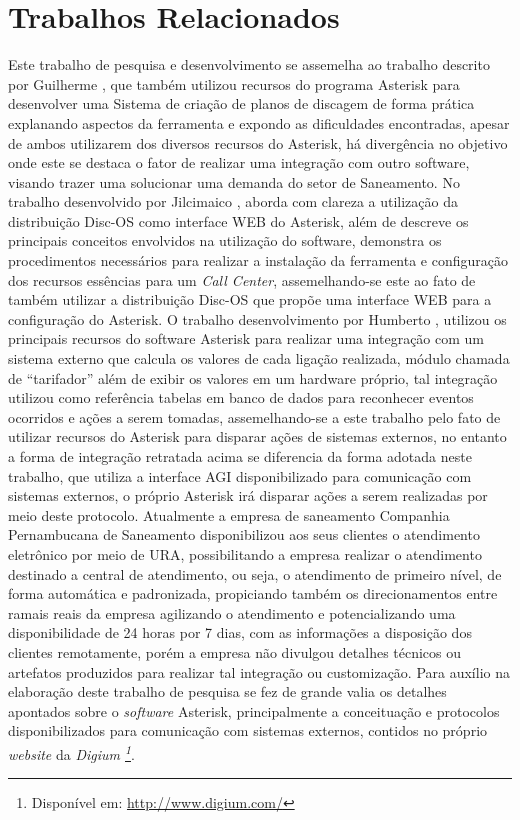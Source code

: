 \section*{Trabalhos Relacionados}
Este trabalho de pesquisa e desenvolvimento se assemelha ao trabalho descrito por Guilherme \cite{VIEIRA:2007}, que também utilizou recursos do programa Asterisk para desenvolver uma Sistema de criação de planos de discagem de forma prática explanando aspectos da ferramenta e expondo as dificuldades encontradas, apesar de ambos utilizarem dos diversos recursos do Asterisk, há divergência no objetivo onde este se destaca o fator de realizar uma integração com outro software, visando trazer uma solucionar uma demanda do setor de Saneamento.  No trabalho desenvolvido por Jilcimaico \cite{DARU:2008}, aborda com clareza a utilização da distribuição Disc-OS como interface WEB do Asterisk, além de descreve os principais conceitos envolvidos na utilização do software, demonstra os procedimentos necessários para realizar a instalação da ferramenta e configuração dos recursos essências para um \textit{Call Center}, assemelhando-se este ao fato de também utilizar a distribuição Disc-OS que propõe uma interface WEB para a configuração do Asterisk.
O trabalho desenvolvimento por Humberto \cite{CAMPOS:2007}, utilizou os principais recursos do software Asterisk para realizar uma integração com um sistema externo que calcula os valores de cada ligação realizada, módulo chamada de “tarifador” além de exibir os valores em um hardware próprio, tal integração utilizou como referência tabelas em banco de dados para reconhecer eventos ocorridos e ações a serem tomadas, assemelhando-se a este trabalho pelo fato de utilizar recursos do Asterisk para disparar ações de sistemas externos, no entanto a forma de integração retratada acima se diferencia da forma adotada neste trabalho, que utiliza a interface AGI disponibilizado para comunicação com sistemas externos, o próprio Asterisk irá disparar ações a serem realizadas por meio deste protocolo.
Atualmente a empresa de saneamento Companhia Pernambucana de Saneamento \cite{COMPESA:URA} disponibilizou aos seus clientes o atendimento eletrônico por meio de URA, possibilitando a empresa realizar o atendimento destinado a central de atendimento, ou seja, o atendimento de primeiro nível, de forma automática e padronizada, propiciando também os direcionamentos entre ramais reais da empresa agilizando o atendimento e potencializando uma disponibilidade de 24 horas por 7 dias, com as informações a disposição dos clientes remotamente, porém a empresa não divulgou detalhes técnicos ou artefatos produzidos para realizar tal integração ou customização.
Para auxílio na elaboração deste trabalho de pesquisa se fez de grande valia os detalhes apontados sobre o \textit{software} Asterisk, principalmente a conceituação e protocolos disponibilizados para comunicação com sistemas externos, contidos no próprio \textit{website} da \textit{Digium \footnote{Disponível em: \url{http://www.digium.com/}}}. 
